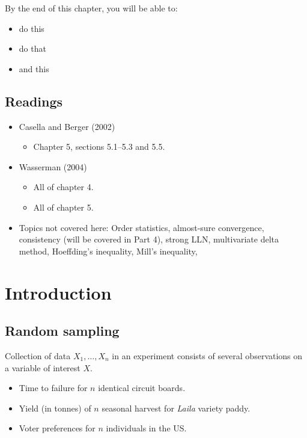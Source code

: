\documentclass[
]{book}
\providecommand{\tightlist}{%
  \setlength{\itemsep}{0pt}\setlength{\parskip}{0pt}}
\theoremstyle{definition}
\theoremstyle{definition}
\theoremstyle{definition}
\theoremstyle{definition}
\theoremstyle{remark}
\begin{document}
By the end of this chapter, you will be able to:

\begin{itemize}
\tightlist
\item
  do this
\item
  do that
\item
  and this
\end{itemize}

\hypertarget{readings-2}{%
\subsection*{Readings}\label{readings-2}}

\begin{itemize}
\tightlist
\item
  Casella and Berger (2002)

  \begin{itemize}
  \tightlist
  \item
    Chapter 5, sections 5.1--5.3 and 5.5.
  \end{itemize}
\item
  Wasserman (2004)

  \begin{itemize}
  \tightlist
  \item
    All of chapter 4.
  \item
    All of chapter 5.
  \end{itemize}
\item
  Topics not covered here: Order statistics, almost-sure convergence, consistency (will be covered in Part 4), strong LLN, multivariate delta method, Hoeffding's inequality, Mill's inequality,
\end{itemize}

\hypertarget{introduction-1}{%
\section{Introduction}\label{introduction-1}}

\hypertarget{random-sampling}{%
\subsection{Random sampling}\label{random-sampling}}

Collection of data \(X_1,\dots,X_n\) in an experiment consists of several observations on a variable of interest \(X\).

\begin{itemize}
\tightlist
\item
  Time to failure for \(n\) identical circuit boards.
\item
  Yield (in tonnes) of \(n\) seasonal harvest for \emph{Laila} variety paddy.
\item
  Voter preferences for \(n\) individuals in the US.
\end{itemize}
\end{document}
